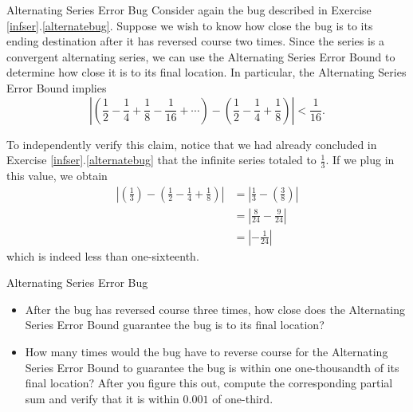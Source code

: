 \begin{example}{Alternating Series Error Bug}
Consider again the bug described in Exercise \ref{infser}.\ref{alternatebug}.  Suppose we wish to know how close the bug is to its ending destination after it has reversed course two times.  Since the series is a convergent alternating series, we can use the Alternating Series Error Bound to determine how close it is to its final location.  In particular, the Alternating Series Error Bound implies $$\left|\left(\frac{1}{2}-\frac{1}{4}+\frac{1}{8}-\frac{1}{16}+\cdots\right)-\left(\frac{1}{2}-\frac{1}{4}+\frac{1}{8}\right)\right|<\frac{1}{16}. $$ 

To independently verify this claim, notice that we had already concluded in Exercise \ref{infser}.\ref{alternatebug} that the infinite series totaled to $\frac{1}{3}$.  If we plug in this value, we obtain \begin{align*}
\left|\left(\frac{1}{3}\right)-\left(\frac{1}{2}-\frac{1}{4}+\frac{1}{8}\right)\right|&=\left|\frac{1}{3}-\left(\frac{3}{8}\right)\right|\\   
&=\left|\frac{8}{24}-\frac{9}{24}\right|\\
&=\left|-\frac{1}{24}\right|
\end{align*}
which is indeed less than one-sixteenth.
\end{example}

\begin{exercise}{Alternating Series Error Bug \Coffeecup \Coffeecup} 
\begin{itemize}
\item  After the bug has reversed course three times, how close does the Alternating Series Error Bound guarantee the bug is to its final location? 
\vspace*{1in}
\item How many times would the bug have to reverse course for the Alternating Series Error Bound to guarantee the bug is within one one-thousandth of its final location?  After you figure this out, compute the corresponding partial sum and verify that it is within $0.001$ of one-third.
\vspace*{1in}
\end{itemize} 
\end{exercise}

